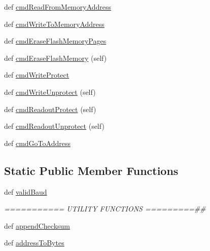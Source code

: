 \begin{DoxyCompactItemize}
\item 
def \hyperlink{classstm__tools_1_1serialflasher_1_1serialtool_1_1SerialTool_a21a14bb04d134beb77f790851b3956d7}{cmd\+Read\+From\+Memory\+Address}
\item 
def \hyperlink{classstm__tools_1_1serialflasher_1_1serialtool_1_1SerialTool_af7ce514b9cb5e567aafc05e96a01b1e9}{cmd\+Write\+To\+Memory\+Address}
\item 
def \hyperlink{classstm__tools_1_1serialflasher_1_1serialtool_1_1SerialTool_ab6e808e3d7d1b8b9f8a7f9b0dccd376f}{cmd\+Erase\+Flash\+Memory\+Pages}
\item 
def \hyperlink{classstm__tools_1_1serialflasher_1_1serialtool_1_1SerialTool_a013542af9288304524060909fb641b57}{cmd\+Erase\+Flash\+Memory} (self)
\item 
def \hyperlink{classstm__tools_1_1serialflasher_1_1serialtool_1_1SerialTool_a024844acf4d48ed3cadb21e65f75d830}{cmd\+Write\+Protect}
\item 
def \hyperlink{classstm__tools_1_1serialflasher_1_1serialtool_1_1SerialTool_aecb5f0ae89714ed9f952b07e5b8e38c4}{cmd\+Write\+Unprotect} (self)
\item 
def \hyperlink{classstm__tools_1_1serialflasher_1_1serialtool_1_1SerialTool_a3cad818dcdf3fc52f4e83c7cf07edb88}{cmd\+Readout\+Protect} (self)
\item 
def \hyperlink{classstm__tools_1_1serialflasher_1_1serialtool_1_1SerialTool_ac8dc5676f06fcfb8f24b0a7899e3c89f}{cmd\+Readout\+Unprotect} (self)
\item 
def \hyperlink{classstm__tools_1_1serialflasher_1_1serialtool_1_1SerialTool_a9d83898b55e0669d5871dce375eeccd8}{cmd\+Go\+To\+Address}
\end{DoxyCompactItemize}
\subsection*{Static Public Member Functions}
\begin{DoxyCompactItemize}
\item 
def \hyperlink{classstm__tools_1_1serialflasher_1_1serialtool_1_1SerialTool_a250e652928311a8f7f3af0c4cbdafa29}{valid\+Baud}
\begin{DoxyCompactList}\small\item\em =========== U\+T\+I\+L\+I\+TY F\+U\+N\+C\+T\+I\+O\+NS =========\#\# \end{DoxyCompactList}\item 
def \hyperlink{classstm__tools_1_1serialflasher_1_1serialtool_1_1SerialTool_a20d2a637920814950ffbc1f9f964b78b}{append\+Checksum}
\item 
def \hyperlink{classstm__tools_1_1serialflasher_1_1serialtool_1_1SerialTool_ad6c7ccd74623d9e2eadd694eb91e7f56}{address\+To\+Bytes}
\end{DoxyCompactItemize}
